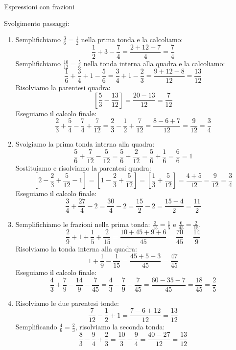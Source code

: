 \begin{esercizio}{Espressioni con frazioni}
\begin{soluzione}
  Svolgimento passaggi:
  \begin{enumerate}[label=\alph*)]
    \item Semplifichiamo $\frac{3}{6} = \frac{1}{2}$ nella prima tonda e la calcoliamo:
      \[
      \frac{1}{2} + 3 - \frac{7}{4} = \frac{2 + 12 - 7}{4} = \frac{7}{4}
      \]
      Semplifichiamo $\frac{10}{12} = \frac{5}{6}$ nella tonda interna alla quadra e la calcoliamo:
      \[
      \frac{1}{6} + \frac{3}{4} + 1 - \frac{5}{6} = \frac{3}{4} + 1 - \frac{2}{3} = \frac{9 + 12 - 8}{12} = \frac{13}{12}
      \]
      Risolviamo la parentesi quadra:
      \[
      \left[ \frac{5}{3} - \frac{13}{12} \right] = \frac{20-13}{12} = \frac{7}{12}
      \]
      Eseguiamo il calcolo finale:
      \[
      \frac{2}{3} + \frac{5}{4} - \frac{7}{4} + \frac{7}{12} = \frac{2}{3} - \frac{1}{2} + \frac{7}{12} = \frac{8-6+7}{12} = \frac{9}{12} = \frac{3}{4}
      \]
    \item Svolgiamo la prima tonda interna alla quadra:
      \[
      \frac{5}{6} + \frac{7}{12} - \frac{5}{12} = \frac{5}{6} + \frac{2}{12} = \frac{5}{6} + \frac{1}{6} = \frac{6}{6} = 1
      \]
      Sostituiamo e risolviamo la parentesi quadra:
      \[
      \left[ 2 - \frac{2}{3} + \frac{5}{12} - 1 \right] = \left[ 1 - \frac{2}{3} + \frac{5}{12} \right] = \left[ \frac{1}{3} + \frac{5}{12} \right] = \frac{4+5}{12} = \frac{9}{12} = \frac{3}{4}
      \]
      Eseguiamo il calcolo finale:
      \[
      \frac{3}{4} + \frac{27}{4} - 2 = \frac{30}{4} - 2 = \frac{15}{2} - 2 = \frac{15-4}{2} = \frac{11}{2}
      \]
    \item Semplifichiamo le frazioni nella prima tonda: $\frac{3}{15} = \frac{1}{5}$ e $\frac{6}{45} = \frac{2}{15}$.
      \[
      \frac{2}{9} + 1 + \frac{1}{5} + \frac{2}{15} = \frac{10 + 45 + 9 + 6}{45} = \frac{70}{45} = \frac{14}{9}
      \]
      Risolviamo la tonda interna alla quadra:
      \[
      1 + \frac{1}{9} - \frac{1}{15} = \frac{45 + 5 - 3}{45} = \frac{47}{45}
      \]
      Eseguiamo il calcolo finale:
      \[
      \frac{4}{3} + \frac{7}{9} - \frac{14}{9} - \frac{7}{45} = \frac{4}{3} - \frac{7}{9} - \frac{7}{45} = \frac{60 - 35 - 7}{45} = \frac{18}{45} = \frac{2}{5}
      \]
    \item Risolviamo le due parentesi tonde:
      \[
      \frac{7}{12} - \frac{1}{2} + 1 = \frac{7-6+12}{12} = \frac{13}{12}
      \]
      Semplificando $\frac{4}{6} = \frac{2}{3}$, risolviamo la seconda tonda:
      \[
      \frac{8}{3} - \frac{9}{4} + \frac{2}{3} = \frac{10}{3} - \frac{9}{4} = \frac{40-27}{12} = \frac{13}{12}
\]
\end{enumerate}
\end{soluzione}
\end{esercizio}
